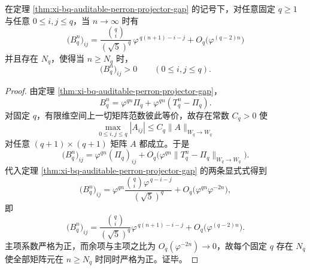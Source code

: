 \begin{corollary}\label{cor:xi-bq-auditable-entrywise-asymptotic-positivity}
在定理 \ref{thm:xi-bq-auditable-perron-projector-gap} 的记号下，对任意固定 \(q\ge 1\) 与任意 \(0\le i,j\le q\)，当 \(n\to\infty\) 时有
\[
\boxed{\;
\bigl(B_q^n\bigr)_{ij}
=
\frac{\binom{q}{i}}{(\sqrt5)^q}\,
\varphi^{\,q(n+1)-i-j}
+O_q\!\bigl(\varphi^{(q-2)n}\bigr)\;}
\]
并且存在 \(N_q\)，使得当 \(n\ge N_q\) 时，
\[
\boxed{\;
\bigl(B_q^n\bigr)_{ij}>0\qquad(0\le i,j\le q).\;}
\]
\end{corollary}
\begin{proof}
由定理 \ref{thm:xi-bq-auditable-perron-projector-gap}，
\[
B_q^n=\varphi^{qn}\Pi_q+\varphi^{qn}(T_q^n-\Pi_q).
\]
对固定 \(q\)，有限维空间上一切矩阵范数彼此等价，故存在常数 \(C_q>0\) 使
\[
\max_{0\le i,j\le q}|A_{ij}|\le C_q\|A\|_{W_q\to W_q}
\]
对任意 \((q+1)\times(q+1)\) 矩阵 \(A\) 都成立。于是
\[
\bigl(B_q^n\bigr)_{ij}
=
\varphi^{qn}(\Pi_q)_{ij}
+O_q\!\bigl(\varphi^{qn}\|T_q^n-\Pi_q\|_{W_q\to W_q}\bigr).
\]
代入定理 \ref{thm:xi-bq-auditable-perron-projector-gap} 的两条显式式得到
\[
\bigl(B_q^n\bigr)_{ij}
=
\varphi^{qn}\frac{\binom{q}{i}\varphi^{\,q-i-j}}{(\sqrt5)^q}
+O_q\!\bigl(\varphi^{qn}\varphi^{-2n}\bigr),
\]
即
\[
\bigl(B_q^n\bigr)_{ij}
=
\frac{\binom{q}{i}}{(\sqrt5)^q}\varphi^{\,q(n+1)-i-j}
+O_q\!\bigl(\varphi^{(q-2)n}\bigr).
\]
主项系数严格为正，而余项与主项之比为 \(O_q(\varphi^{-2n})\to 0\)，故每个固定 \(q\) 存在 \(N_q\) 使全部矩阵元在 \(n\ge N_q\) 时同时严格为正。证毕。
\end{proof}

